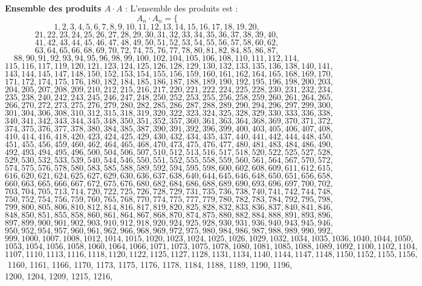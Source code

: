 \documentclass[11pt,a4paper]{article}
\begin{document}
\textbf{Ensemble des produits $A \cdot A$} :
L'ensemble des produits est :
$$ A_{{{n}}} \cdot A_{{{n}}} = \{ $$$$ 1, 2, 3, 4, 5, 6, 7, 8, 9, 10, 11, 12, 13, 14, 15, 16, 17, 18, 19, 20, $$$$ 21, 22, 23, 24, 25, 26, 27, 28, 29, 30, 31, 32, 33, 34, 35, 36, 37, 38, 39, 40, $$$$ 41, 42, 43, 44, 45, 46, 47, 48, 49, 50, 51, 52, 53, 54, 55, 56, 57, 58, 60, 62, $$$$ 63, 64, 65, 66, 68, 69, 70, 72, 74, 75, 76, 77, 78, 80, 81, 82, 84, 85, 86, 87, $$$$ 88, 90, 91, 92, 93, 94, 95, 96, 98, 99, 100, 102, 104, 105, 106, 108, 110, 111, 112, 114, $$$$ 115, 116, 117, 119, 120, 121, 123, 124, 125, 126, 128, 129, 130, 132, 133, 135, 136, 138, 140, 141, $$$$ 143, 144, 145, 147, 148, 150, 152, 153, 154, 155, 156, 159, 160, 161, 162, 164, 165, 168, 169, 170, $$$$ 171, 172, 174, 175, 176, 180, 182, 184, 185, 186, 187, 188, 189, 190, 192, 195, 196, 198, 200, 203, $$$$ 204, 205, 207, 208, 209, 210, 212, 215, 216, 217, 220, 221, 222, 224, 225, 228, 230, 231, 232, 234, $$$$ 235, 238, 240, 242, 243, 245, 246, 247, 248, 250, 252, 253, 255, 256, 258, 259, 260, 261, 264, 265, $$$$ 266, 270, 272, 273, 275, 276, 279, 280, 282, 285, 286, 287, 288, 289, 290, 294, 296, 297, 299, 300, $$$$ 301, 304, 306, 308, 310, 312, 315, 318, 319, 320, 322, 323, 324, 325, 328, 329, 330, 333, 336, 338, $$$$ 340, 341, 342, 343, 344, 345, 348, 350, 351, 352, 357, 360, 361, 363, 364, 368, 369, 370, 371, 372, $$$$ 374, 375, 376, 377, 378, 380, 384, 385, 387, 390, 391, 392, 396, 399, 400, 403, 405, 406, 407, 408, $$$$ 410, 414, 416, 418, 420, 423, 424, 425, 429, 430, 432, 434, 435, 437, 440, 441, 442, 444, 448, 450, $$$$ 451, 455, 456, 459, 460, 462, 464, 465, 468, 470, 473, 475, 476, 477, 480, 481, 483, 484, 486, 490, $$$$ 492, 493, 494, 495, 496, 500, 504, 506, 507, 510, 512, 513, 516, 517, 518, 520, 522, 525, 527, 528, $$$$ 529, 530, 532, 533, 539, 540, 544, 546, 550, 551, 552, 555, 558, 559, 560, 561, 564, 567, 570, 572, $$$$ 574, 575, 576, 578, 580, 583, 585, 588, 589, 592, 594, 595, 598, 600, 602, 608, 609, 611, 612, 615, $$$$ 616, 620, 621, 624, 625, 627, 629, 630, 636, 637, 638, 640, 644, 645, 646, 648, 650, 651, 656, 658, $$$$ 660, 663, 665, 666, 667, 672, 675, 676, 680, 682, 684, 686, 688, 689, 690, 693, 696, 697, 700, 702, $$$$ 703, 704, 705, 713, 714, 720, 722, 725, 726, 728, 729, 731, 735, 736, 738, 740, 741, 742, 744, 748, $$$$ 750, 752, 754, 756, 759, 760, 765, 768, 770, 774, 775, 777, 779, 780, 782, 783, 784, 792, 795, 798, $$$$ 799, 800, 805, 806, 810, 812, 814, 816, 817, 819, 820, 825, 828, 832, 833, 836, 837, 840, 841, 846, $$$$ 848, 850, 851, 855, 858, 860, 861, 864, 867, 868, 870, 874, 875, 880, 882, 884, 888, 891, 893, 896, $$$$ 897, 899, 900, 901, 902, 903, 910, 912, 918, 920, 924, 925, 928, 930, 931, 936, 940, 943, 945, 946, $$$$ 950, 952, 954, 957, 960, 961, 962, 966, 968, 969, 972, 975, 980, 984, 986, 987, 988, 989, 990, 992, $$$$ 999, 1000, 1007, 1008, 1012, 1014, 1015, 1020, 1023, 1024, 1025, 1026, 1029, 1032, 1034, 1035, 1036, 1040, 1044, 1050, $$$$ 1053, 1054, 1056, 1058, 1060, 1064, 1066, 1071, 1073, 1075, 1078, 1080, 1081, 1085, 1088, 1089, 1092, 1100, 1102, 1104, $$$$ 1107, 1110, 1113, 1116, 1118, 1120, 1122, 1125, 1127, 1128, 1131, 1134, 1140, 1144, 1147, 1148, 1150, 1152, 1155, 1156, $$$$ 1160, 1161, 1166, 1170, 1173, 1175, 1176, 1178, 1184, 1188, 1189, 1190, 1196, 1200, 1204, 1209, 1215, 1216, 
\end{document}
